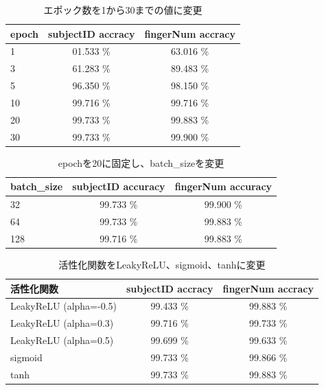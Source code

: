 \documentclass[a4paper, 11pt, titlepage]{jsarticle}
\begin{document}
\begin{table}[htb]
\begin{center}
\caption{エポック数を1から30までの値に変更}
  \begin{tabular}{|l|c|c|}
    \hline
    epoch & subjectID accracy & fingerNum accracy \\ \hline
    1 & 01.533 \% & 63.016 \%  \\ \hline
    3 & 61.283 \% & 89.483 \% \\ \hline
    5 & 96.350 \% & 98.150 \%  \\ \hline
    10 & 99.716 \% & 99.716 \%  \\ \hline
    20 & 99.733 \% & 99.883 \%  \\ \hline
    30 & 99.733 \% & 99.900 \% \\ \hline
  \end{tabular}
  \label{change:epoch}
 \end{center}
\end{table}

\begin{table}[htb]
\begin{center}
\caption{epochを20に固定し、batch\_sizeを変更}
  \begin{tabular}{|l|c|c|}
    \hline
    batch\_size & subjectID accuracy & fingerNum accuracy  \\ \hline
    32 & 99.733 \% & 99.900 \% \\ \hline
    64 & 99.733 \% & 99.883 \% \\ \hline
    128 & 99.716 \% & 99.883 \% \\ \hline
  \end{tabular}
    \label{change:batch}
\end{center}
\end{table}

\begin{table}[htb]
\begin{center}
\caption{活性化関数をLeakyReLU、sigmoid、tanhに変更}
  \begin{tabular}{|l|c|c|}
    \hline
    活性化関数 & subjectID accracy & fingerNum accracy \\ \hline
    LeakyReLU (alpha=-0.5) & 99.433 \% & 99.883 \% \\ \hline
    LeakyReLU (alpha=0.3) & 99.716 \% & 99.733 \% \\ \hline
    LeakyReLU (alpha=0.5) & 99.699 \% & 99.633 \% \\ \hline
    sigmoid & 99.733 \% & 99.866 \% \\ \hline
    tanh & 99.733 \% & 99.883 \% \\ \hline
  \end{tabular}
    \label{change:activation}
 \end{center}
\end{table}
\end{document}
